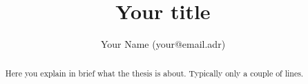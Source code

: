 \documentclass[a4paper,11pt]{report}
\title{Your title}
\author{Your Name (your@email.adr)}
\begin{document}


\maketitle

\begin{abstract}
Here you explain in brief what the thesis is about. Typically only a
couple of lines.
\end{abstract}

\small
\setcounter{secnumdepth}{-1}

\setcounter{secnumdepth}{3}
\tableofcontents
\listoffigures
\listoftables
\normalsize
\newpage

\setcounter{secnumdepth}{-1}

\setcounter{secnumdepth}{3}





\appendix



\end{document}
